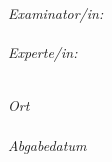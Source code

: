\begin{titlepage}
\begin{center}
\begin{minipage}[t]{0.4\textwidth}
\begin{flushright}
    \large
    \emph{Examinator/in:} \\
    \supnameA \\
    \vspace{0.5cm}
    \emph{Experte/in:} \\
    \supnameB \\
\end{flushright}
\end{minipage}

\vfill

{\large
\emph{Ort} \\
\tloc \\
\vspace{0.2cm}
\emph{Abgabedatum} \\
\tdate \\
\vspace{1.5cm}
}


%

\vfill
\end{center}
\end{titlepage}
\restoregeometry
